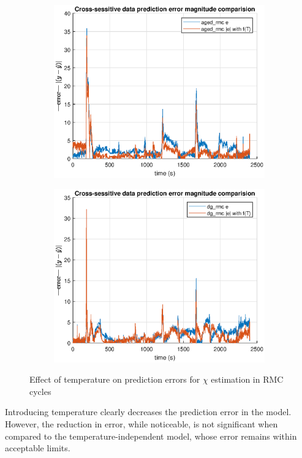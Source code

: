 \begin{figure}[H]
    \begin{minipage}{0.49\textwidth}
        \begin{figure}[H]
            \includegraphics[width=\textwidth]{./figs/chi_est/aged_error_comp.eps}
        \end{figure}
    \end{minipage}
    \begin{minipage}{0.49\textwidth}
        \begin{figure}[H]
            \includegraphics[width=\textwidth]{./figs/chi_est/dg_error_comp.eps}
        \end{figure}
    \end{minipage}
        \caption{Effect of temperature on prediction errors for $\chi$ estimation in RMC cycles}
\end{figure}


Introducing temperature clearly decreases the prediction error in the model. However, the reduction in error, while noticeable, is not significant when compared to the temperature-independent model, whose error remains within acceptable limits.
